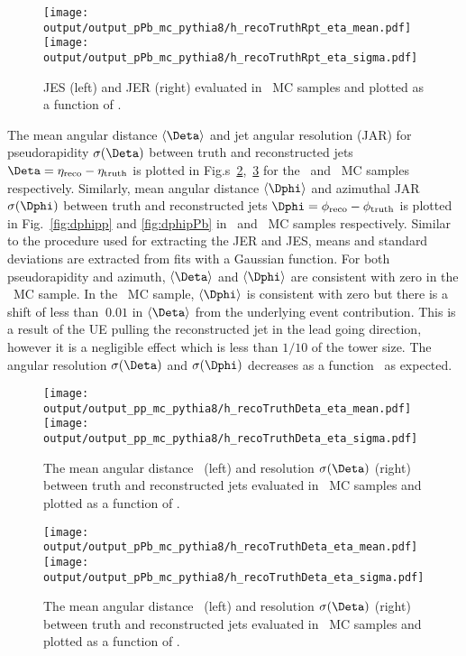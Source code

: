 \begin{figure}
	\centerline{
		\texttt{[image: output/output\_pPb\_mc\_pythia8/h\_recoTruthRpt\_eta\_mean.pdf]} 
		\texttt{[image: output/output\_pPb\_mc\_pythia8/h\_recoTruthRpt\_eta\_sigma.pdf]} }
	\caption{JES (left) and JER (right) evaluated in \pPb\ MC samples and plotted as a function of \pttruth. }
	\label{fig:jesjerpPb}
\end{figure}

The mean angular distance $\langle\Deta\rangle$ and jet angular resolution (JAR) for pseudorapidity $\sigma(\Deta)$ between truth and reconstructed jets $\Deta = \eta_{\mathrm{reco}} - \eta_{\mathrm{truth}}$ is plotted in Fig.s~\ref{fig:detapp},~\ref{fig:detapPb} for the \pp\ and \pPb\ MC samples respectively. Similarly, mean angular distance $\langle\Dphi\rangle$ and azimuthal JAR $\sigma(\Dphi)$ between truth and reconstructed jets $\Dphi = \phi_{\mathrm{reco}} - \phi_{\mathrm{truth}}$ is plotted in Fig.~\ref{fig:dphipp} and \ref{fig:dphipPb} in \pp\ and \pPb\ MC samples respectively. Similar to the procedure used for extracting the JER and JES, means and standard deviations are extracted from fits with a Gaussian function. For both pseudorapidity and azimuth, $\langle\Deta\rangle$ and $\langle\Dphi\rangle$ are consistent with zero in the \pp\ MC sample. In the \pPb\ MC sample, $\langle\Dphi\rangle$ is consistent with zero but there is a shift of less than $~0.01$ in $\langle\Deta\rangle$ from the underlying event contribution. This is a result of the UE pulling the reconstructed jet in the lead going direction, however it is a negligible effect which is less than $1/10$ of the tower size. The angular resolution $\sigma(\Deta)$ and $\sigma(\Dphi)$ decreases as a function \pttruth\ as expected.

\begin{figure}
	\centerline{
		\texttt{[image: output/output\_pp\_mc\_pythia8/h\_recoTruthDeta\_eta\_mean.pdf]} 
		\texttt{[image: output/output\_pp\_mc\_pythia8/h\_recoTruthDeta\_eta\_sigma.pdf]}
	}
	\caption{The mean angular distance \Deta\ (left) and resolution $\sigma(\Deta)$ (right) between truth and reconstructed jets evaluated in \pp\ MC samples and plotted as a function of \pttruth. }
	\label{fig:detapp}
\end{figure}

\begin{figure}
	\centerline{
		\texttt{[image: output/output\_pPb\_mc\_pythia8/h\_recoTruthDeta\_eta\_mean.pdf]}
		\texttt{[image: output/output\_pPb\_mc\_pythia8/h\_recoTruthDeta\_eta\_sigma.pdf]}
	}
	\caption{The mean angular distance \Deta\ (left) and resolution $\sigma(\Deta)$ (right) between truth and reconstructed jets evaluated in \pPb\ MC samples and plotted as a function of \pttruth. }
	\label{fig:detapPb}
\end{figure}

